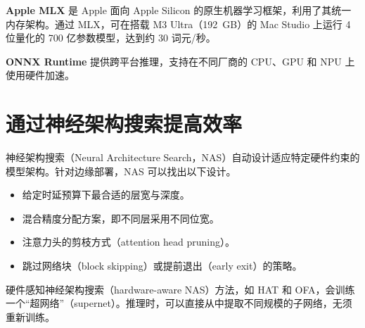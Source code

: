 \textbf{Apple MLX} 是 Apple 面向 Apple Silicon 的原生机器学习框架，利用了其统一内存架构。通过 MLX，可在搭载 M3 Ultra（192~GB）的 Mac Studio 上运行 4 位量化的 700 亿参数模型，达到约 30 词元/秒。

\textbf{ONNX Runtime} 提供跨平台推理，支持在不同厂商的 CPU、GPU 和 NPU 上使用硬件加速。

\section{通过神经架构搜索提高效率}

神经架构搜索（Neural Architecture Search，NAS）自动设计适应特定硬件约束的模型架构。针对边缘部署，NAS 可以找出以下设计。

\begin{itemize}
  \item 给定时延预算下最合适的层宽与深度。
  \item 混合精度分配方案，即不同层采用不同位宽。
  \item 注意力头的剪枝方式（attention head pruning）。
  \item 跳过网络块（block skipping）或提前退出（early exit）的策略。
\end{itemize}

硬件感知神经架构搜索（hardware-aware NAS）方法，如 HAT 和 OFA，会训练一个“超网络”（supernet）。推理时，可以直接从中提取不同规模的子网络，无须重新训练。

